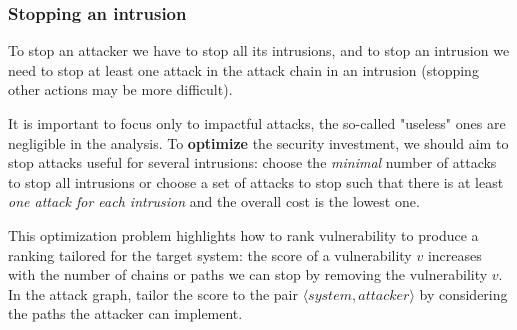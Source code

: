 
\subsubsection{Stopping an intrusion}
To stop an attacker we have to stop all its intrusions, 
and to stop an intrusion we need to stop at least one attack in the attack chain in an intrusion (stopping other actions may be more difficult).

It is important to focus only to impactful attacks,
the so-called "useless" ones are negligible in the analysis.
To \textbf{optimize} the security investment,
we should aim to stop attacks useful for several intrusions:
choose the \textit{minimal} number of attacks to stop all intrusions
or
choose a set of attacks to stop such that there is at least \textit{one attack for
each intrusion} and the overall cost is the lowest one.

This optimization problem highlights how to rank vulnerability
to produce a ranking tailored for the target system:
the score of a vulnerability $v$ increases with the number of chains or paths
we can stop by removing the vulnerability $v$.
In the attack graph, 
tailor the score to the pair $\langle system, attacker \rangle$ by considering
the paths the attacker can implement.

